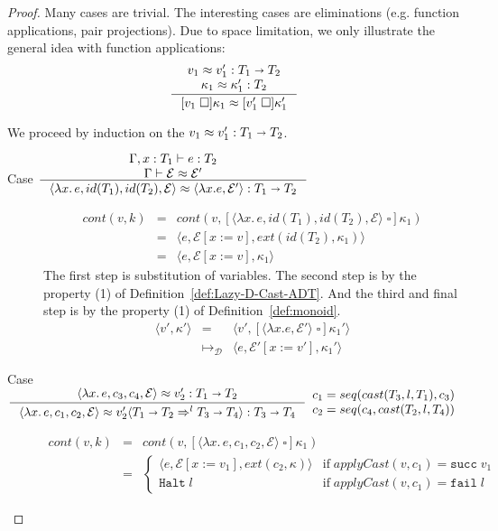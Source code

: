 \documentclass[acmsmall,review]{acmart}\settopmatter{printfolios=true,printccs=false,printacmref=false}
\newcommand{\sOOinspect}[3]{\langle#1,#2,#3\rangle}
\newcommand{\sOOreturn}[2]{\langle#1,#2\rangle}
\newcommand{\sOOhalt}[1]{\mathtt{Halt} \; #1}
\newcommand{\POOfun}[2]{#1 \shortrightarrow #2}
\newcommand{\cOOcast}[3]{#1 \Rightarrow^{#2} #3}
\newcommand{\vOOcast}[2]{#1\langle#2\rangle}
\newcommand{\vOOfun}[3]{\langle \lambda  #2. #3, #1 \rangle}
\newcommand{\rOOsucc}[1]{\mathtt{succ}\;#1}
\newcommand{\rOOfail}[1]{\mathtt{fail}\;#1}
\newcommand{\kOOappII}[2]{
  [#1 \; \square]#2}
\newcommand{\hcvOOfun}[5]{\langle \lambda #3.\, #4 , #1 , #5, #2 \rangle}
\newcommand{\sidecond}[1]{\text{if}\;#1}
\newcommand{\ineffCEKD}{\ensuremath{\mathcal{D}}}
\newcommand{\continue}[2]{cont(#2,#1)}
\begin{document}
\begin{proof}
Many cases are trivial. The interesting cases are eliminations 
(e.g. function applications, pair projections). Due to space limitation, 
we only illustrate the general idea with function applications:
\[\inference{
	v_1 \approx v_1' : \POOfun{T_1}{T_2} \\
	\kappa_1 \approx \kappa_1' : T_2
}{
	\kOOappII{v_1}{\kappa_1} \approx \kOOappII{v_1'}{\kappa_1'}
}\]

We proceed by induction on the $v_1 \approx v_1' : \POOfun{T_1}{T_2}$.

\begin{description}
	\item[Case $\inference{
		\Gamma , x : T_1 \vdash e : T_2
		\\
		\Gamma \vdash \mathcal{E} \approx \mathcal{E}'
	}{
		\hcvOOfun{id(T_1)}{\mathcal{E}}{x}{e}{id(T_2)}
		\approx
		\vOOfun{\mathcal{E}'}{x}{e}
		: \POOfun{T_1}{T_2}
	}$]
\[
\begin{array}{rcl}
\continue{k}{v}
	&=
	&\continue{\kOOappII{\hcvOOfun{id(T_1)}{\mathcal{E}}{x}{e}{id(T_2)}}{\kappa_1}}{v}
	\\
	&=
	&\sOOinspect{e}{\mathcal{E}[x:=v]}{ext(id(T_2),\kappa_1)}
	\\
	&=
	&\sOOinspect{e}{\mathcal{E}[x:=v]}{\kappa_1}
\end{array}
\]
The first step is substitution of variables. The second step is by the property 
(1) of Definition~\ref{def:Lazy-D-Cast-ADT}. And the third and final step is by 
the property (1) of Definition~\ref{def:monoid}.
\[
\begin{array}{rll}
\sOOreturn{v'}{\kappa'} 
	&=
	&\sOOreturn{v'}{\kOOappII{\vOOfun{\mathcal{E}'}{x}{e}}{\kappa_1'}}\\
	&\longmapsto_{\ineffCEKD}
	&\sOOinspect{e}{\mathcal{E}'[x:=v']}{\kappa_1'}
\end{array}
\]
\item[Case 
$\inference{
	\hcvOOfun{c_3}{\mathcal{E}}{x}{e}{c_4} \approx v_2' : \POOfun{T_1}{T_2}
}{
	\hcvOOfun{c_1}{\mathcal{E}}{x}{e}{c_2}
		\approx
	\vOOcast{v_2'}{\cOOcast{\POOfun{T_1}{T_2}}{l}{\POOfun{T_3}{T_4}}}
		: \POOfun{T_3}{T_4}
}
\begin{array}{l}
	c_1 = seq(cast(T_3,l,T_1),c_3) \\
	c_2 = seq(c_4,cast(T_2,l,T_4))
\end{array}$] 
\[
\begin{array}{rcl}
\continue{k}{v}
&=
&\continue{\kOOappII{\hcvOOfun{c_1}{\mathcal{E}}{x}{e}{c_2}}{\kappa_1}}{v}
\\
&=
&\begin{cases}
\sOOinspect{e}{\mathcal{E}[x:=v_1]}{ext(c_2,\kappa)}  &
\sidecond{applyCast(v,c_1) = \rOOsucc{v_1}}
\\
\sOOhalt{l} &
\sidecond{applyCast(v,c_1) = \rOOfail{l}}
\end{cases}
\end{array}
\]


\end{description}
\end{proof}
\end{document}
